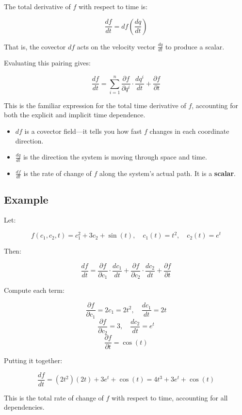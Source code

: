 \documentclass{article}
\begin{document}
The total derivative of \( f \) with respect to time is:

\[
\frac{df}{dt} = df\left( \frac{dq}{dt} \right)
\]

That is, the covector \( df \) acts on the velocity vector \( \frac{dq}{dt} \) to produce a scalar.

Evaluating this pairing gives:

\[
\frac{df}{dt} = \sum_{i=1}^n \frac{\partial f}{\partial q^i} \cdot \frac{dq^i}{dt} + \frac{\partial f}{\partial t}
\]

This is the familiar expression for the total time derivative of \( f \), accounting for both the explicit and implicit time dependence.

\begin{itemize}
    \item \( df \) is a covector field—it tells you how fast \( f \) changes in each coordinate direction.
    \item \( \frac{dq}{dt} \) is the direction the system is moving through space and time.
    \item \( \frac{df}{dt} \) is the rate of change of \( f \) along the system's actual path. It is a \textbf{scalar}.
\end{itemize}


\subsection{Example}

Let:

\[
f(c_1, c_2, t) = c_1^2 + 3c_2 + \sin(t), \quad c_1(t) = t^2, \quad c_2(t) = e^t
\]

Then:

\[
\frac{df}{dt} = \frac{\partial f}{\partial c_1} \cdot \frac{dc_1}{dt} + \frac{\partial f}{\partial c_2} \cdot \frac{dc_2}{dt} + \frac{\partial f}{\partial t}
\]

Compute each term:

\[
\frac{\partial f}{\partial c_1} = 2c_1 = 2t^2, \quad \frac{dc_1}{dt} = 2t
\]
\[
\frac{\partial f}{\partial c_2} = 3, \quad \frac{dc_2}{dt} = e^t
\]
\[
\frac{\partial f}{\partial t} = \cos(t)
\]

Putting it together:

\[
\frac{df}{dt} = (2t^2)(2t) + 3e^t + \cos(t) = 4t^3 + 3e^t + \cos(t)
\]

This is the total rate of change of \( f \) with respect to time, accounting for all dependencies.

\newpage
\end{document}
